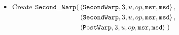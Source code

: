 \begin{itemize}
\begin{itemize}
            \item Create
            $\begin{aligned}[t]
                \secondwarp(& \left\langle {\tt SecondWarp}, 3, u, \inc, {\tt msr}, {\tt msd} \right\rangle, \\ %
                            & \left\langle {\tt SecondWarp}, 3, u, \inc, {\tt msr}, {\tt msd} \right\rangle, \\ %
                            & \left\langle {\tt PostWarp},   3, u, \inc, {\tt msr}, {\tt msd} \right\rangle \;) %
            \end{aligned}$
        \end{itemize}

        \begin{figure}[H]
            \centering
            {}%

\end{figure}
\end{itemize}
